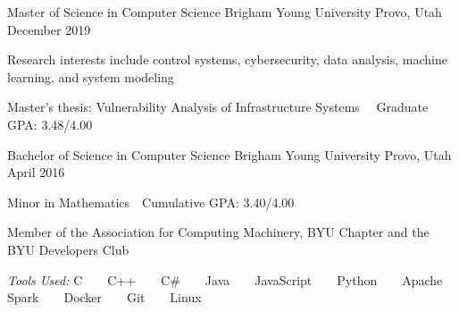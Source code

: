 

\begin{cventries}

  \cventry
    {Master of Science in Computer Science} %
    {Brigham Young University} %
    {Provo, Utah} %
    {December 2019} %
    {
      \begin{cvitems} %
        \item {Research interests include control systems, cybersecurity, data analysis, machine learning, and system modeling}
        \item {Master's thesis: Vulnerability Analysis of Infrastructure Systems ~\textemdash~Graduate GPA: 3.48/4.00}
      \end{cvitems}
    }
    {}

  \cventry
    {Bachelor of Science in Computer Science} %
    {Brigham Young University } %
    {Provo, Utah} %
    {April 2016} %
    {
      \begin{cvitems} %
        \item {Minor in Mathematics~\textemdash~Cumulative GPA: 3.40/4.00}
        \item {Member of the Association for Computing Machinery, BYU Chapter and the BYU Developers Club}
      \end{cvitems}
    }
    {
      \emph{Tools Used:} C ~ \bullet ~ C++ ~ \bullet ~ C\# ~ \bullet ~ Java ~ \bullet ~ JavaScript ~ \bullet ~ Python ~ \bullet ~ Apache Spark ~ \bullet ~ Docker ~ \bullet ~ Git ~ \bullet ~ Linux
    }

\end{cventries}
